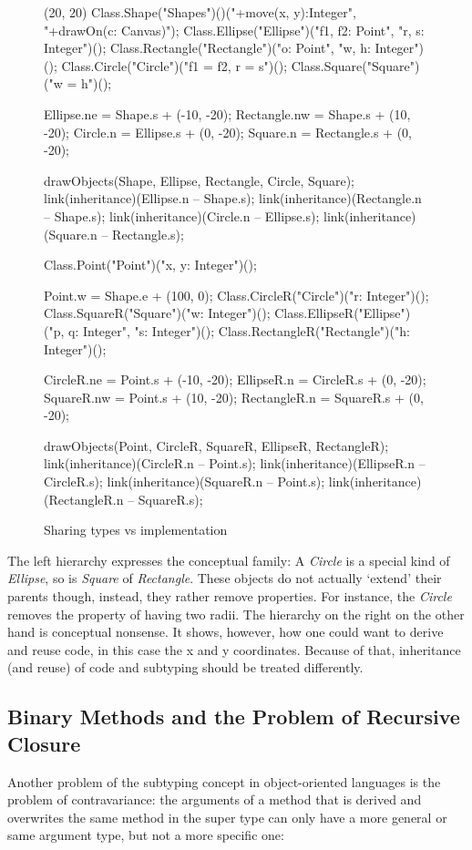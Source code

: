 \begin{figure}[H]
	\centering
	\begin{emp}[classdiag](20, 20)
		Class.Shape("Shapes")()("+move(x, y):Integer", "+drawOn(c: Canvas)");
		Class.Ellipse("Ellipse")("f1, f2: Point", "r, s: Integer")();
		Class.Rectangle("Rectangle")("o: Point", "w, h: Integer")();
		Class.Circle("Circle")("{f1 = f2, r = s}")();
		Class.Square("Square")("{w = h}")();

		Ellipse.ne = Shape.s + (-10, -20);
		Rectangle.nw = Shape.s + (10, -20);
		Circle.n = Ellipse.s + (0, -20);
		Square.n = Rectangle.s + (0, -20);

		drawObjects(Shape, Ellipse, Rectangle, Circle, Square);
		link(inheritance)(Ellipse.n -- Shape.s);
		link(inheritance)(Rectangle.n -- Shape.s);
		link(inheritance)(Circle.n -- Ellipse.s);
		link(inheritance)(Square.n -- Rectangle.s);

		Class.Point("Point")("x, y: Integer")();

		Point.w = Shape.e + (100, 0);
		Class.CircleR("Circle")("r: Integer")();
		Class.SquareR("Square")("w: Integer")();
		Class.EllipseR("Ellipse")("p, q: Integer", "s: Integer")();
		Class.RectangleR("Rectangle")("h: Integer")();

		CircleR.ne = Point.s + (-10, -20);
		EllipseR.n = CircleR.s + (0, -20);
		SquareR.nw = Point.s + (10, -20);
		RectangleR.n = SquareR.s + (0, -20);

		drawObjects(Point, CircleR, SquareR, EllipseR, RectangleR);
		link(inheritance)(CircleR.n -- Point.s);
		link(inheritance)(EllipseR.n -- CircleR.s);
		link(inheritance)(SquareR.n -- Point.s);
		link(inheritance)(RectangleR.n -- SquareR.s);
	\end{emp}
	\caption{Sharing types vs implementation}
	\label{fig:implementationConflict}
\end{figure}

The left hierarchy expresses the conceptual family: A \emph{Circle}
is a special kind of \emph{Ellipse}, so is \emph{Square} of
\emph{Rectangle}. These objects do not actually `extend' their parents
though, instead, they rather remove properties. For instance, the
\emph{Circle} removes the property of having two radii. The hierarchy on
the right on the other hand is conceptual nonsense. It shows, however,
how one could want to derive and reuse code, in this case the x and
y coordinates. Because of that, inheritance (and reuse) of code and
subtyping should be treated differently.

\subsection{Binary Methods and the Problem of Recursive Closure}
\label{sec:recursiveClosure}
Another problem of the subtyping concept in object-oriented languages is
the problem of contravariance: the arguments of a method that is derived
and overwrites the same method in the super type can only have a more
general or same argument type, but not a more specific one:

